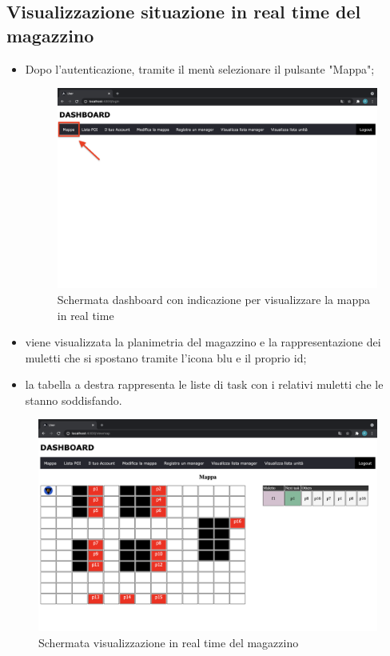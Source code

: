 \subsection{Visualizzazione situazione in real time del magazzino}
\begin{itemize}
    \item Dopo l'autenticazione, tramite il menù selezionare il pulsante "Mappa";
    \begin{figure}[H]
        \centering
        \includegraphics[scale=0.2]{res/images/dashboard1.png}
        \caption{Schermata dashboard con indicazione per visualizzare la mappa in real time}
    \end{figure}
    \item viene visualizzata la planimetria del magazzino e la rappresentazione dei muletti che si spostano tramite l'icona blu e il proprio id;
    \item la tabella a destra rappresenta le liste di task con i relativi muletti che le stanno soddisfando.
    
\end{itemize}

\begin{figure}[H]
    \centering
    \includegraphics[scale=0.2]{res/images/map_user.png}
    \caption{Schermata visualizzazione in real time del magazzino}
\end{figure}

